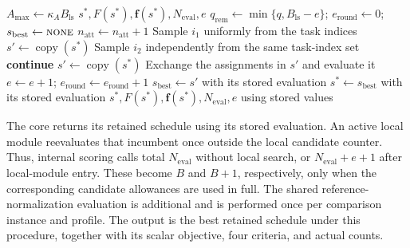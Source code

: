 \documentclass[pdflatex,onecolumn,sn-mathphys-num]{sn-jnl}
\begin{document}
\begin{algorithm}[p]
\addtocounter{algorithm}{-1}
\caption{Cloud LSCBO with archived and recommended guarded pair reassignment (continued)}
\small
\begin{algorithmic}[1]
    \State $A_{\max}\leftarrow\kappa_A B_{\mathrm{ls}}$
        \State \Return $s^*,F(s^*),\mathbf{f}(s^*),N_{\mathrm{eval}},e$
    \EndIf
\EndIf
{}
    \State $q_{\mathrm{rem}}\leftarrow\min\{q,B_{\mathrm{ls}}-e\}$; $e_{\mathrm{round}}\leftarrow0$; $s_{\mathrm{best}}\leftarrow\textsc{none}$
         \State $n_{\mathrm{att}}\leftarrow n_{\mathrm{att}}+1$ \EndIf
        \State Sample $i_1$ uniformly from the task indices
         \State $s'\leftarrow\operatorname{copy}(s^*)$ \EndIf
        \State Sample $i_2$ independently from the same task-index set
            \State \textbf{continue}
        \EndIf
         \State $s'\leftarrow\operatorname{copy}(s^*)$ \EndIf
        \State Exchange the assignments in $s'$ and evaluate it
        \State $e\leftarrow e+1$; $e_{\mathrm{round}}\leftarrow e_{\mathrm{round}}+1$
                \State $s_{\mathrm{best}}\leftarrow s'$ with its stored evaluation
            \EndIf
        \EndIf
    \EndWhile
        \State $s^*\leftarrow s_{\mathrm{best}}$ with its stored evaluation
    \EndIf
\EndWhile
\State \Return $s^*,F(s^*),\mathbf{f}(s^*),N_{\mathrm{eval}},e$ using stored values
\end{algorithmic}
\end{algorithm}

The core returns its retained schedule using its stored evaluation. An active local module reevaluates that incumbent once outside the local candidate counter. Thus, internal scoring calls total $N_{\mathrm{eval}}$ without local search, or $N_{\mathrm{eval}}+e+1$ after local-module entry. These become $B$ and $B+1$, respectively, only when the corresponding candidate allowances are used in full. The shared reference-normalization evaluation is additional and is performed once per comparison instance and profile. The output is the best retained schedule under this procedure, together with its scalar objective, four criteria, and actual counts.
\end{document}
